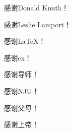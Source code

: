
\begin{thanks}
  感谢Donald Knuth！

  感谢Leslie Lamport！

  感谢\LaTeX！

  感谢ex！

  感谢导师！

  感谢NJU！

  感谢父母！

  感谢上帝！

\end{thanks}
